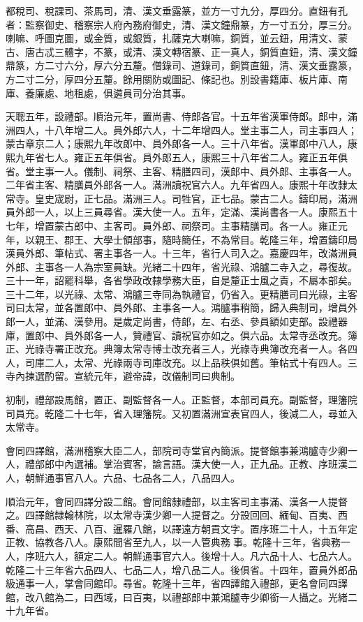 \begin{pinyinscope}
都稅司、稅課司、茶馬司，清、漢文垂露篆，並方一寸九分，厚四分。直鈕有孔者：監察御史、稽察宗人府內務府御史，清、漢文鐘鼎篆，方一寸五分，厚三分。喇嘛、呼圖克圖，或金質，或銀質，扎薩克大喇嘛，銅質，並云鈕，用清文、蒙古、唐古忒三體字，不篆，或清、漢文轉宿篆、正一真人，銅質直鈕，清、漢文鐘鼎篆，方二寸六分，厚六分五釐。僧錄司、道錄司，銅質直鈕，清、漢文垂露篆，方二寸二分，厚四分五釐。餘用關防或圖記、條記也。別設書籍庫、板片庫、南庫、養廉處、地租處，俱遴員司分治其事。

天聰五年，設禮部。順治元年，置尚書、侍郎各官。十五年省漢軍侍郎。郎中，滿洲四人，十八年增二人。員外郎六人，十二年增四人。堂主事二人，司主事四人；蒙古章京二人；康熙九年改郎中、員外郎各一人。三十八年省。漢軍郎中八人，康熙九年省七人。雍正五年俱省。員外郎五人，康熙三十八年省二人。雍正五年俱省。堂主事一人。儀制、祠祭、主客、精膳四司，漢郎中、員外郎、主事各一人。二年省主客、精膳員外郎各一人。滿洲讀祝官六人。九年省四人。康熙十年改隸太常寺。皇史宬尉，正七品。滿洲三人。司牲官，正七品。蒙古二人。鑄印局，滿洲員外郎一人，以上三員尋省。漢大使一人。五年，定滿、漢尚書各一人。康熙五十七年，增置蒙古郎中、主客司。員外郎、祠祭司。主事精膳司。各一人。雍正元年，以親王、郡王、大學士領部事，隨時簡任，不為常目。乾隆三年，增置鑄印局漢員外郎、筆帖式、署主事各一人。十三年，省行人司入之。嘉慶四年，改滿洲員外郎、主事各一人為宗室員缺。光緒二十四年，省光祿、鴻臚二寺入之，尋復故。三十一年，詔罷科舉，各省學政改隸學務大臣，自是釐正士風之責，不屬本部矣。三十二年，以光祿、太常、鴻臚三寺同為執禮官，仍省入。更精膳司曰光祿，主客司曰太常，並各置郎中、員外郎、主事各一人。鴻臚事稍簡，歸入典制司，增員外郎一人，並滿、漢參用。是歲定尚書，侍郎，左、右丞、參員額如吏部。設禮器庫，置郎中、員外郎各一人，贊禮官、讀祝官亦如之。俱六品。太常寺丞改充。簿正、光祿寺署正改充。典簿太常寺博士改充者三人，光祿寺典簿改充者一人。各四人，司庫二人，太常、光祿兩寺司庫改充。以上品秩俱如舊。筆帖式十有四人。三寺內揀選酌留。宣統元年，避帝諱，改儀制司曰典制。

初制，禮部設馬館，置正、副監督各一人。正監督，本部司員充。副監督，理籓院司員充。乾隆二十七年，省入理籓院。又初置滿洲宣表官四人，後減二人，尋並入太常寺。

會同四譯館，滿洲稽察大臣二人，部院司寺堂官內簡派。提督館事兼鴻臚寺少卿一人，禮部郎中內選補。掌治賓客，諭言語。漢大使一人，正九品。正教、序班漢二人，朝鮮通事官八人。六品、七品各二人，八品四人。

順治元年，會同四譯分設二館。會同館隸禮部，以主客司主事滿、漢各一人提督之。四譯館隸翰林院，以太常寺漢少卿一人提督之。分設回回、緬甸、百夷、西番、高昌、西天、八百、暹羅八館，以譯遠方朝貢文字。置序班二十人，十五年定正教、協教各八人。康熙間省至九人，以一人管典務事。乾隆十三年，省典務一人，序班六人，額定二人。朝鮮通事官六人。後增十人。凡六品十人、七品六人。乾隆二十三年省六品四人、七品二人，增八品二人。後俱省。十四年，置員外郎品級通事一人，掌會同館印。尋省。乾隆十三年，省四譯館入禮部，更名會同四譯館，改八館為二，曰西域，曰百夷，以禮部郎中兼鴻臚寺少卿銜一人攝之。光緒二十九年省。


\end{pinyinscope}
